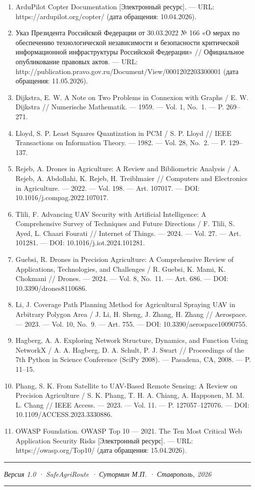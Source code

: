 \begin{enumerate}
\item
  ArduPilot Copter Documentation {[}Электронный ресурс{]}. --- URL: https://ardupilot.org/copter/ (дата обращения: 10.04.2026).
\item
  Указ Президента Российской Федерации от 30.03.2022 № 166 «О мерах по обеспечению технологической независимости и безопасности критической информационной инфраструктуры Российской Федерации» // Официальное опубликование правовых актов. --- URL: http://publication.pravo.gov.ru/Document/View/0001202203300001 (дата обращения: 11.05.2026).
\item
  Dijkstra, E. W. A Note on Two Problems in Connexion with Graphs / E. W. Dijkstra // Numerische Mathematik. --- 1959. --- Vol. 1, No.~1. --- P. 269--271.
\item
  Lloyd, S. P. Least Squares Quantization in PCM / S. P. Lloyd // IEEE Transactions on Information Theory. --- 1982. --- Vol. 28, No.~2. --- P. 129--137.
\item
  Rejeb, A. Drones in Agriculture: A Review and Bibliometric Analysis / A. Rejeb, A. Abdollahi, K. Rejeb, H. Treiblmaier // Computers and Electronics in Agriculture. --- 2022. --- Vol. 198. --- Art. 107017. --- DOI: 10.1016/j.compag.2022.107017.
\item
  Tlili, F. Advancing UAV Security with Artificial Intelligence: A Comprehensive Survey of Techniques and Future Directions / F. Tlili, S. Ayed, L. Chaari Fourati // Internet of Things. --- 2024. --- Vol. 27. --- Art. 101281. --- DOI: 10.1016/j.iot.2024.101281.
\item
  Guebsi, R. Drones in Precision Agriculture: A Comprehensive Review of Applications, Technologies, and Challenges / R. Guebsi, K. Mami, K. Chokmani // Drones. --- 2024. --- Vol. 8, No.~11. --- Art. 686. --- DOI: 10.3390/drones8110686.
\item
  Li, J. Coverage Path Planning Method for Agricultural Spraying UAV in Arbitrary Polygon Area / J. Li, H. Sheng, J. Zhang, H. Zhang // Aerospace. --- 2023. --- Vol. 10, No.~9. --- Art. 755. --- DOI: 10.3390/aerospace10090755.
\item
  Hagberg, A. A. Exploring Network Structure, Dynamics, and Function Using NetworkX / A. A. Hagberg, D. A. Schult, P. J. Swart // Proceedings of the 7th Python in Science Conference (SciPy 2008). --- Pasadena, CA, 2008. --- P. 11--15.
\item
  Phang, S. K. From Satellite to UAV-Based Remote Sensing: A Review on Precision Agriculture / S. K. Phang, T. H. A. Chiang, A. Happonen, M. M. L. Chang // IEEE Access. --- 2023. --- Vol. 11. --- P. 127057--127076. --- DOI: 10.1109/ACCESS.2023.3330886.
\item
  OWASP Foundation. OWASP Top 10 --- 2021. The Ten Most Critical Web Application Security Risks {[}Электронный ресурс{]}. --- URL: https://owasp.org/Top10/ (дата обращения: 15.04.2026).
\end{enumerate}

\begin{center}\rule{0.5\linewidth}{0.5pt}\end{center}

\emph{Версия 1.0 · SafeAgriRoute · Сутормин М.П. · Ставрополь, 2026}

\begin{center}\rule{0.5\linewidth}{0.5pt}\end{center}
